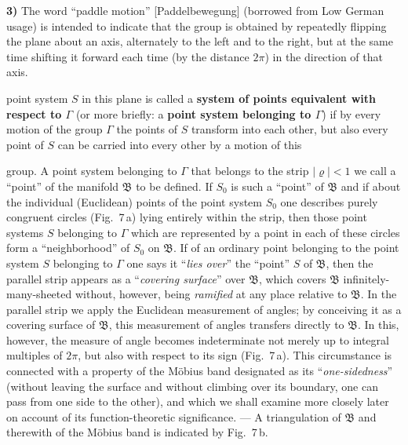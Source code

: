 \documentclass{article}
\begin{document}
\textbf{3)} The word ``paddle motion'' [Paddelbewegung] (borrowed from Low German usage) is intended to indicate that the group is obtained by repeatedly flipping the plane about an axis, alternately to the left and to the right, but at the same time shifting it forward each time (by the distance $2\pi$) in the direction of that axis.

point system $S$ in this plane is called a \textbf{system of points equivalent with respect to $\varGamma$} (or more briefly: a \textbf{point system belonging to $\varGamma$}) if by every motion of the group $\varGamma$ the points of $S$ transform into each other, but also every point of $S$ can be carried into every other by a motion of this


group. A point system belonging to $\varGamma$ that belongs to the strip $|\varrho| < 1$ we call a ``point'' of the manifold $\mathfrak{B}$ to be defined. If $S_0$ is such a ``point'' of $\mathfrak{B}$ and if about the individual (Euclidean) points of the point system $S_0$ one describes purely congruent circles (Fig.~7\,a) lying entirely within the strip, then those point systems $S$ belonging to $\varGamma$ which are represented by a point in each of these circles form a ``neighborhood'' of $S_0$ on $\mathfrak{B}$. If of an ordinary point belonging to the point system $S$ belonging to $\varGamma$ one says it ``\emph{lies over}'' the ``point'' $S$ of $\mathfrak{B}$, then the parallel strip appears as a ``\emph{covering surface}'' over $\mathfrak{B}$, which covers $\mathfrak{B}$ infinitely-many-sheeted without, however, being \emph{ramified} at any place relative to $\mathfrak{B}$. In the parallel strip we apply the Euclidean measurement of angles; by conceiving it as a covering surface of $\mathfrak{B}$, this measurement of angles transfers directly to $\mathfrak{B}$. In this, however, the measure of angle becomes indeterminate not merely up to integral multiples of $2\pi$, but also with respect to its sign (Fig.~7\,a). This circumstance is connected with a property of the Möbius band designated as its ``\emph{one-sidedness}'' (without leaving the surface and without climbing over its boundary, one can pass from one side to the other), and which we shall examine more closely later on account of its function-theoretic significance. --- A triangulation of $\mathfrak{B}$ and therewith of the Möbius band is indicated by Fig.~7\,b.

\end{document}
